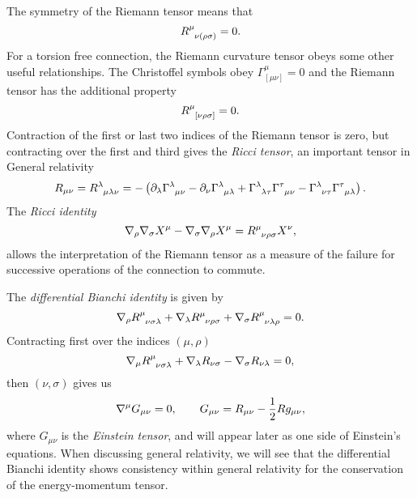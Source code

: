 The symmetry of the Riemann tensor means that
\begin{equation*}
	\tensor{R}{^\mu_{\nu (\rho \sigma)}} = 0.
\end{equation*}
For a torsion free connection, the Riemann curvature tensor obeys some other useful relationships. The Christoffel symbols obey $\Gamma^\mu_{[\mu \nu]} = 0$ and the Riemann tensor has the additional property
\begin{equation*}
	\tensor{R}{^\mu_{[\nu \rho \sigma]}} = 0.
\end{equation*}
Contraction of the first or last two indices of the Riemann tensor is zero, but contracting over the first and third gives the \emph{Ricci tensor}, an important tensor in General relativity
\begin{equation}
\label{eq:ric}
  R_{\mu \nu} = \tensor{R}{^{\lambda}_{\mu \lambda \nu}} = -\left( \partial_\lambda \tensor{\Gamma}{^{\lambda}_{\mu \nu}} - \partial_\nu \tensor{\Gamma}{^{\lambda}_{\mu \lambda}} + \tensor{\Gamma}{^{\lambda}_{\lambda \tau}}\tensor{\Gamma}{^{\tau}_{\mu \nu}} - \tensor{\Gamma}{^{\lambda}_{\nu \tau}}\tensor{\Gamma}{^{\tau}_{\mu \lambda}} \right).
\end{equation}
The \emph{Ricci identity}
\begin{equation}
\label{eq:ricid}
	\nabla_\rho \nabla_\sigma X^\mu - \nabla_\sigma \nabla_\rho X^\mu = \tensor{R}{^\mu_{\nu \rho \sigma}} X^\nu,
\end{equation}
allows the interpretation of the Riemann tensor as a measure of the failure for successive operations of the connection to commute. 

The \emph{differential Bianchi identity} is given by
\begin{equation*}
	\nabla_\rho \tensor{R}{^\mu_{\nu \sigma \lambda}} + \nabla_\lambda \tensor{R}{^\mu_{\nu \rho \sigma }} + \nabla_\sigma \tensor{R}{^\mu_{\nu \lambda \rho}} = 0.
\end{equation*}
Contracting first over the indices $(\mu, \rho)$
\begin{equation*}
	\nabla_\mu \tensor{R}{^\mu_{\nu \sigma \lambda}} + \nabla_\lambda R_{\nu \sigma } - \nabla_\sigma R_{\nu \lambda} = 0,
\end{equation*}
then $(\nu,\sigma)$ gives us
\begin{equation*}
	\nabla^\mu G_{\mu \nu} = 0, \qquad G_{\mu \nu} = R_{\mu \nu} - \frac{1}{2} R g_{\mu \nu},
\end{equation*}
where $G_{\mu \nu}$ is the \emph{Einstein tensor}, and will appear later as one side of Einstein's equations. When discussing general relativity, we will see that the differential Bianchi identity shows consistency within general relativity for the conservation of the energy-momentum tensor.

